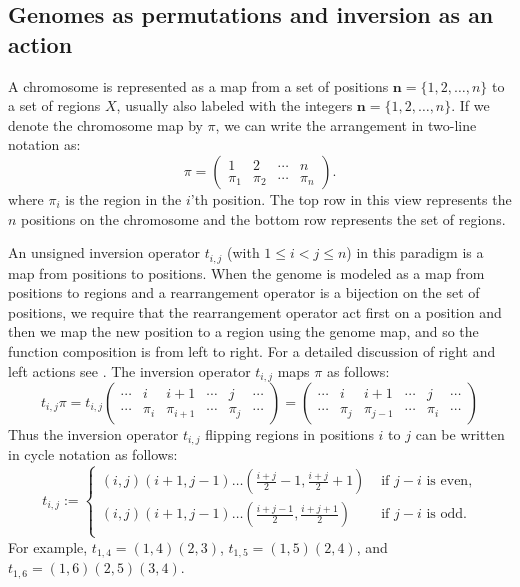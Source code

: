 \documentclass[utf8]{Frontiers_LaTex_Templates/frontiersFPHY} %
\newcommand{\tij}[1]{t_{#1}}
\newcommand{\n}{\mathbf n}
\numberwithin{equation}{section}
\begin{document}
\medskip
\subsection*{Genomes as permutations and inversion as an action}

A chromosome is represented as a map from a set of positions $\n=\{ 1,2,\dots,n\}$ to a set of regions $X$, usually also labeled with the integers $\n=\{1,2,\dots,n\}$. If we denote the chromosome map by $\pi$, we can write the arrangement in two-line notation as:
\[
\pi=\begin{pmatrix}
1 & 2 & \cdots & n\\
\pi_1 & \pi_2 & \cdots & \pi_n
\end{pmatrix}.
\]
where $\pi_i$ is the region in the $i$'th position.
The top row in this view represents the $n$ positions on the chromosome and the bottom row represents the set of regions.  


An unsigned inversion operator $\tij{i,j}$ (with $1\le i<j\le n$) in this paradigm is a map from positions to positions. 
When the genome is modeled as a map from positions to regions and a rearrangement operator is a bijection on the set of positions, we require that the rearrangement operator act first on a position and then we map the new position to a region using the genome map,
and so the function composition is from left to right. For a detailed discussion of right and left actions see \citet{bhatia2018position}. The inversion operator $\tij{i,j}$ maps $\pi$ as follows:
\[
\tij{i,j}\pi=
\tij{i,j} \begin{pmatrix}
\cdots & i     & i+1       & \cdots & j     & \cdots\\
\cdots & \pi_i & \pi_{i+1} & \cdots & \pi_j & \cdots
\end{pmatrix} =  
\begin{pmatrix}
\cdots & i & i+1 & \cdots & j & \cdots\\
\cdots & \pi_j & \pi_{j-1} & \cdots & \pi_i & \cdots
\end{pmatrix}
\]
Thus the inversion operator $\tij{i,j}$ flipping regions in positions $i$ to $j$ can be written in cycle notation as follows:
\[ \tij{i,j} := 
\begin{cases}
(i,j)(i+1, j-1)\dots (\frac{i+j}{2} - 1, \frac{i+j}{2} + 1) & \text{ if } j -i \text{ is even,} \\
(i,j)(i+1, j-1)\dots (\frac{i+j-1}{2}, \frac{i+j+1}{2}) & \text{ if } j -i \text{ is odd.} \\
\end{cases} \]
%
For example, $t_{1,4}=(1,4)(2,3)$, $t_{1,5}=(1, 5)(2, 4)$, and $t_{1,6} = (1, 6)(2, 5)(3, 4)$.
\end{document}
